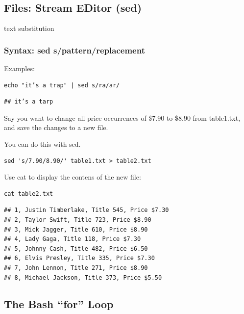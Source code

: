 \documentclass[
]{book}
\begin{document}
\hypertarget{files-stream-editor-sed}{%
\subsection{\texorpdfstring{Files: \textbf{S}tream \textbf{ED}itor (sed)}{Files: Stream EDitor (sed)}}\label{files-stream-editor-sed}}

text substitution

\hypertarget{syntax-sed-spatternreplacement}{%
\subsubsection*{Syntax: sed s/pattern/replacement}\label{syntax-sed-spatternreplacement}}

Examples:

\begin{verbatim}
echo "it’s a trap" | sed s/ra/ar/
\end{verbatim}

\begin{verbatim}
## it’s a tarp
\end{verbatim}

Say you want to change all price occurrences of \$7.90 to \$8.90 from table1.txt, and save the changes to a new file.

You can do this with sed.

\begin{verbatim}
sed 's/7.90/8.90/' table1.txt > table2.txt
\end{verbatim}

Use cat to display the contens of the new file:

\begin{verbatim}
cat table2.txt
\end{verbatim}

\begin{verbatim}
## 1, Justin Timberlake, Title 545, Price $7.30
## 2, Taylor Swift, Title 723, Price $8.90
## 3, Mick Jagger, Title 610, Price $8.90
## 4, Lady Gaga, Title 118, Price $7.30
## 5, Johnny Cash, Title 482, Price $6.50
## 6, Elvis Presley, Title 335, Price $7.30
## 7, John Lennon, Title 271, Price $8.90
## 8, Michael Jackson, Title 373, Price $5.50
\end{verbatim}

\hypertarget{the-bash-for-loop}{%
\subsection{The Bash ``for'' Loop}\label{the-bash-for-loop}}
\end{document}
